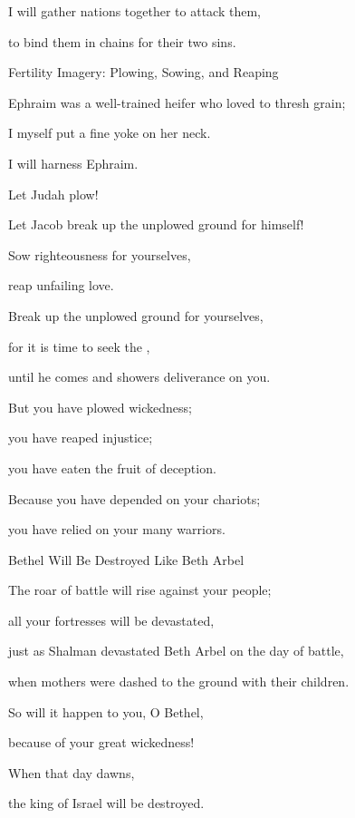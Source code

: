 {\par }{\Q I will gather
nations
together to attack them,

\par }{\Q to bind
them in chains for their two sins.
\par }{\SH Fertility Imagery: Plowing, Sowing, and Reaping
\par }{\Q {}Ephraim
was a well-trained
heifer
who loved
to thresh
grain;
\par }{\Q I myself
put a fine yoke on her neck.
\par }{\Q I will harness Ephraim.
\par }{\Q Let Judah plow!
\par }{\Q Let Jacob break up the unplowed ground for himself!
\par }{\Q {}Sow
righteousness
for yourselves,
\par }{\Q reap
unfailing love.
\par }{\Q Break up
the unplowed ground
for yourselves,
\par }{\Q for it is time
to seek
the
{},
\par }{\Q until
he comes
and showers
deliverance on you.
\par }{\Q {}But
you have plowed
wickedness;
\par }{\Q you have reaped
injustice;
\par }{\Q you have eaten
the fruit
of deception.
\par }{\Q Because
you have depended on
your chariots;

\par }{\Q you have relied on
your many
warriors.
\par }{\SH Bethel Will Be Destroyed Like Beth Arbel
\par }{\Q {}The roar
of battle will rise against
your people;
\par }{\Q all
your fortresses
will be devastated,
\par }{\Q just as Shalman
devastated
Beth Arbel
on the day
of battle,
\par }{\Q when mothers
were dashed to the ground
with their children.
\par }{\Q {}So
will it happen
to you, O Bethel,
\par }{\Q because
of your great wickedness!
\par }{\Q When that day dawns,
\par }{\Q the king
of Israel
will be destroyed.

\par }
